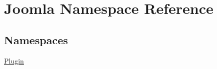 \hypertarget{namespace_joomla}{}\section{Joomla Namespace Reference}
\label{namespace_joomla}
\subsection*{Namespaces}
\begin{DoxyCompactItemize}
\item 
 \mbox{\hyperlink{namespace_joomla_1_1_plugin}{Plugin}}
\end{DoxyCompactItemize}
